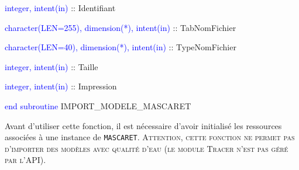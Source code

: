\documentclass[a4paper,11pt]{article}
\begin{document}
        \hspace{1cm} \textcolor{blue}{integer, intent(in)}  :: Identifiant
        
        \hspace{1cm} \textcolor{blue}{character(LEN=255), dimension(*), intent(in)} :: TabNomFichier
        
        \hspace{1cm} \textcolor{blue}{character(LEN=40), dimension(*), intent(in)} :: TypeNomFichier
        
        \hspace{1cm} \textcolor{blue}{integer, intent(in)}  :: Taille
        
        \hspace{1cm} \textcolor{blue}{integer, intent(in)}  :: Impression
        
    \textcolor{blue}{end subroutine} IMPORT\_MODELE\_MASCARET

 \vspace{0.5cm}

 Avant d'utiliser cette fonction, il est n\'ecessaire d'avoir initialis\'e les ressources associ\'ees \`a une instance de \texttt{MASCARET}. \textsc{Attention, cette fonction ne permet pas d'importer des mod\`eles avec qualit\'e d'eau (le module Tracer n'est pas g\'er\'e par l'API)}.

 \vspace{0.5cm}
 
\end{document}
